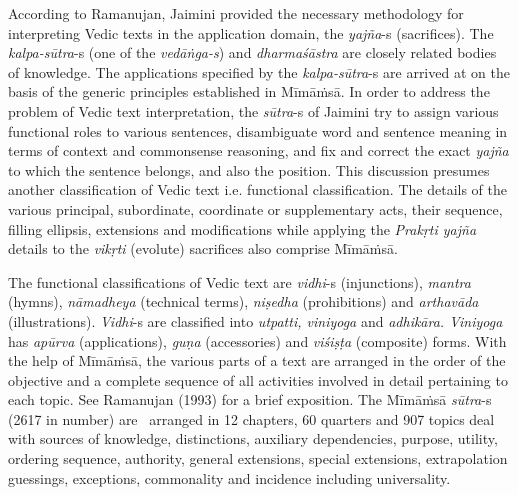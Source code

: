 According to Ramanujan, Jaimini provided the necessary methodology for interpreting Vedic texts in the application domain, the \textit{yajña}-s (sacrifices). The \textit{kalpa-sūtra}-s (one of the \textit{vedāṅga-s}) and \textit{dharmaśāstra} are closely related bodies of knowledge. The applications specified by the \textit{kalpa-sūtra}-s are arrived at on the basis of the generic principles established in Mīmāṁsā. In order to address the problem of Vedic text interpretation, the \textit{sūtra}-s of Jaimini try to assign various functional roles to various sentences, disambiguate word and sentence meaning in terms of context and commonsense reasoning, and fix and correct the exact \textit{yajña} to which the sentence belongs, and also the position. This discussion presumes another classification of Vedic text i.e. functional classification. The details of the various principal, subordinate, coordinate or supplementary acts, their sequence, filling ellipsis, extensions and modifications while applying the \textit{Prakṛti yajña} details to the \textit{vikṛti} (evolute) sacrifices also comprise Mīmāṁsā.

\vskip 3pt

The functional classifications of Vedic text are \textit{vidhi}-s (injunctions), \textit{mantra} (hymns), \textit{nāmadheya} (technical terms), \textit{niṣedha} (prohibitions) and \textit{arthavāda} (illustrations). \textit{Vidhi}-s are classified into \textit{utpatti, viniyoga} and \textit{adhikāra. Viniyoga} has \textit{apūrva} (applications), \textit{guṇa} (accessories) and \textit{viśiṣṭa} (composite) forms. With the help of Mīmāṁsā, the various parts of a text are arranged in the order of the objective and a complete sequence of all activities involved in detail pertaining to each topic. See Ramanujan (1993) for a brief exposition. The Mīmāṁsā \hbox{\textit{sūtra}-s} (2617 in number) are  arranged in 12 chapters, 60 quarters and 907 topics deal with sources of knowledge, distinctions, auxiliary dependencies, purpose, utility, ordering sequence, authority, general extensions, special extensions, extrapolation guessings, exceptions, commonality and incidence including universality.

